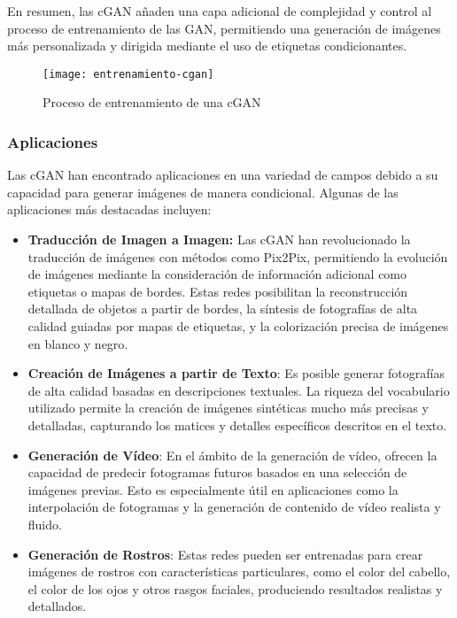 En resumen, las cGAN añaden una capa adicional de complejidad y control al proceso de entrenamiento de las GAN, permitiendo una generación de imágenes más personalizada y dirigida mediante el uso de etiquetas condicionantes.

\begin{figure}[H]
    \centering
    \texttt{[image: entrenamiento-cgan]}
    \caption{Proceso de entrenamiento de una cGAN}
    \label{fig:entrenamiento-cgan}
\end{figure}


\subsubsection{Aplicaciones}

Las cGAN han encontrado aplicaciones en una variedad de campos debido a su capacidad para generar imágenes de manera condicional. Algunas de las aplicaciones más destacadas incluyen:

\begin{itemize}
    \item \textbf{Traducción de Imagen a Imagen:} Las cGAN han revolucionado la traducción de imágenes con métodos como Pix2Pix, permitiendo la evolución de imágenes mediante la consideración de información adicional como etiquetas o mapas de bordes. Estas redes posibilitan la reconstrucción detallada de objetos a partir de bordes, la síntesis de fotografías de alta calidad guiadas por mapas de etiquetas, y la colorización precisa de imágenes en blanco y negro.
    
    \item \textbf{Creación de Imágenes a partir de Texto}: Es posible generar fotografías de alta calidad basadas en descripciones textuales. La riqueza del vocabulario utilizado permite la creación de imágenes sintéticas mucho más precisas y detalladas, capturando los matices y detalles específicos descritos en el texto.
    
    \item \textbf{Generación de Vídeo}: En el ámbito de la generación de vídeo, ofrecen la capacidad de predecir fotogramas futuros basados en una selección de imágenes previas. Esto es especialmente útil en aplicaciones como la interpolación de fotogramas y la generación de contenido de vídeo realista y fluido.
    
    \item \textbf{Generación de Rostros}: Estas redes pueden ser entrenadas para crear imágenes de rostros con características particulares, como el color del cabello, el color de los ojos y otros rasgos faciales, produciendo resultados realistas y detallados.
\end{itemize}

